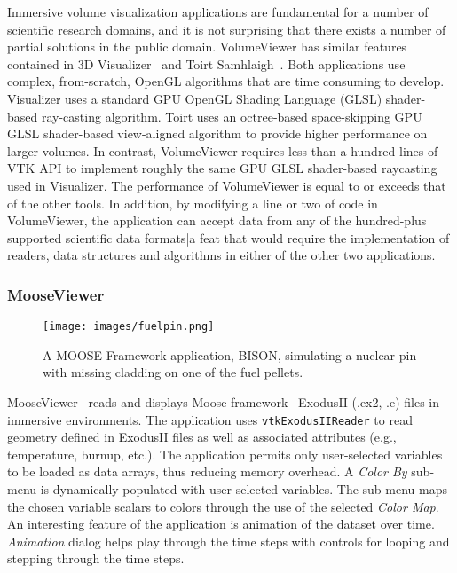 Immersive volume visualization applications are fundamental for a number of scientific research domains, and it is not surprising that there exists a number of partial solutions in the public domain. VolumeViewer has similar features contained in 3D Visualizer~\cite{Billen:2008} and Toirt Samhlaigh~\cite{O'Leary:2008}. Both applications use complex, from-scratch, OpenGL algorithms that are time consuming to develop. Visualizer uses a standard GPU OpenGL Shading Language (GLSL) shader-based ray-casting algorithm. Toirt uses an octree-based space-skipping GPU GLSL shader-based view-aligned algorithm to provide higher performance on larger volumes. In contrast, VolumeViewer requires less than a hundred lines of VTK API to implement roughly the same GPU GLSL shader-based raycasting used in Visualizer. The performance of VolumeViewer is equal to or exceeds that of the other tools. In addition, by modifying a line or two of code in VolumeViewer, the application can accept data from any of the hundred-plus supported scientific data formats|a feat that would require the implementation of readers, data structures and algorithms in either of the other two applications.

\subsubsection{MooseViewer}

\begin{figure}[h!]
 \centering
 \texttt{[image: images/fuelpin.png]}
 \caption{A MOOSE Framework application, BISON, simulating a nuclear pin with missing cladding on one of the fuel pellets.}
 \label{fig:fuelpin}
\end{figure}

MooseViewer~\cite{MooseViewer} reads and displays Moose framework~\cite{Gaston:2015, MooseFramework} ExodusII (.ex2, .e) files in immersive environments. The application uses \texttt{vtkExodusIIReader} to read geometry defined in ExodusII files as well as associated attributes (e.g., temperature, burnup, etc.). The application permits only user-selected variables to be loaded as data arrays, thus reducing memory overhead. A \textit{Color By} sub-menu is dynamically populated with user-selected variables. The sub-menu maps the chosen variable scalars to colors through the use of the selected \textit{Color Map}.
An interesting feature of the application is animation of the dataset over time.
\textit{Animation} dialog helps play through the time steps with controls for looping and stepping through the time steps.

